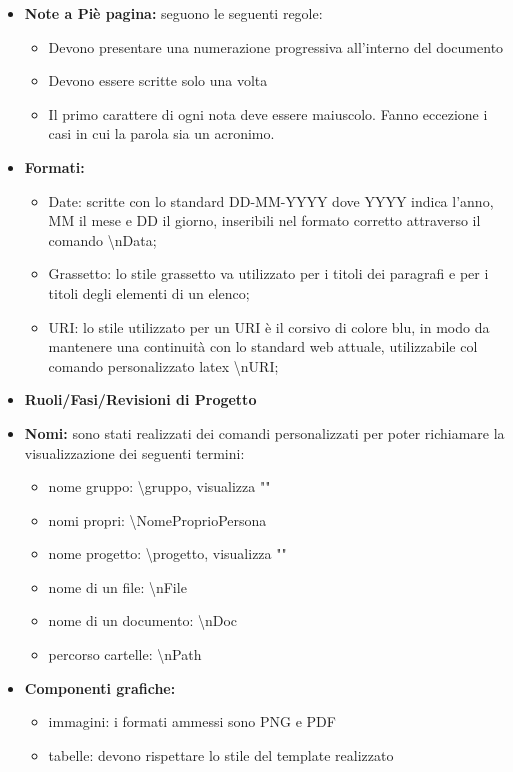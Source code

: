 \documentclass[NormeDiProgetto.tex]{subfiles}
\begin{document}
\begin{itemize}
			\item \textbf{Note a Piè pagina:} seguono le seguenti regole: 
			\begin{itemize}
				\item Devono presentare una numerazione progressiva all'interno del documento
				\item Devono essere scritte solo una volta
				\item Il primo carattere di ogni nota deve essere maiuscolo. Fanno eccezione i casi in cui la parola sia un acronimo.
			\end{itemize}
			 
			\item \textbf{Formati:}
			\begin{itemize}
				\item Date: scritte con lo standard DD-MM-YYYY dove YYYY indica l'anno, MM il mese e DD il giorno, inseribili nel formato corretto attraverso il comando \textbackslash nData;
				\item Grassetto: lo stile grassetto va utilizzato per i titoli dei paragrafi e per i titoli degli elementi di un elenco; 
				\item URI: lo stile utilizzato per un URI è il corsivo di colore blu, in modo da mantenere una continuità con lo standard web attuale, utilizzabile col comando personalizzato latex \textbackslash nURI;
			\end{itemize}
			
			\item \textbf{Ruoli/Fasi/Revisioni di Progetto} %
			
			\item \textbf{Nomi:} sono stati realizzati dei comandi personalizzati per poter richiamare la visualizzazione dei seguenti termini:
			\begin{itemize}
				\item nome gruppo: \textbackslash gruppo, visualizza "\gruppo"
				\item nomi propri: \textbackslash NomeProprioPersona 
				\item nome progetto: \textbackslash progetto, visualizza "\progetto"
				\item nome di un file: \textbackslash nFile
				\item nome di un documento: \textbackslash nDoc
				\item percorso cartelle: \textbackslash nPath
			\end{itemize}
		
			\item \textbf{Componenti grafiche:}
			 \begin{itemize}
			 	\item immagini: i formati ammessi sono PNG e PDF 
			 	\item tabelle: devono rispettare lo stile del template realizzato %
			 \end{itemize}
			
		\end{itemize}
	
\end{document}
